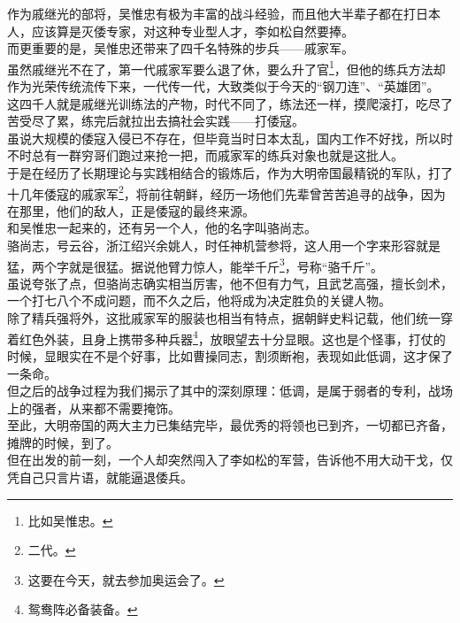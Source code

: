 \begin{multicols}{\theparacolNo}
作为戚继光的部将，吴惟忠有极为丰富的战斗经验，而且他大半辈子都在打日本人，应该算是灭倭专家，对这种专业型人才，李如松自然要捧。\\

而更重要的是，吴惟忠还带来了四千名特殊的步兵——戚家军。\\

虽然戚继光不在了，第一代戚家军要么退了休，要么升了官\footnote{比如吴惟忠。}，但他的练兵方法却作为光荣传统流传下来，一代传一代，大致类似于今天的“钢刀连”、“英雄团”。\\

这四千人就是戚继光训练法的产物，时代不同了，练法还一样，摸爬滚打，吃尽了苦受尽了累，练完后就拉出去搞社会实践——打倭寇。\\

虽说大规模的倭寇入侵已不存在，但毕竟当时日本太乱，国内工作不好找，所以时不时总有一群穷哥们跑过来抢一把，而戚家军的练兵对象也就是这批人。\\

于是在经历了长期理论与实践相结合的锻炼后，作为大明帝国最精锐的军队，打了十几年倭寇的戚家军\footnote{二代。}，将前往朝鲜，经历一场他们先辈曾苦苦追寻的战争，因为在那里，他们的敌人，正是倭寇的最终来源。\\

和吴惟忠一起来的，还有另一个人，他的名字叫骆尚志。\\

骆尚志，号云谷，浙江绍兴余姚人，时任神机营参将，这人用一个字来形容就是猛，两个字就是很猛。据说他臂力惊人，能举千斤\footnote{这要在今天，就去参加奥运会了。}，号称“骆千斤”。\\

虽说夸张了点，但骆尚志确实相当厉害，他不但有力气，且武艺高强，擅长剑术，一个打七八个不成问题，而不久之后，他将成为决定胜负的关键人物。\\

除了精兵强将外，这批戚家军的服装也相当有特点，据朝鲜史料记载，他们统一穿着红色外装，且身上携带多种兵器\footnote{鸳鸯阵必备装备。}，放眼望去十分显眼。这也是个怪事，打仗的时候，显眼实在不是个好事，比如曹操同志，割须断袍，表现如此低调，这才保了一条命。\\

但之后的战争过程为我们揭示了其中的深刻原理：低调，是属于弱者的专利，战场上的强者，从来都不需要掩饰。\\

至此，大明帝国的两大主力已集结完毕，最优秀的将领也已到齐，一切都已齐备，摊牌的时候，到了。\\

但在出发的前一刻，一个人却突然闯入了李如松的军营，告诉他不用大动干戈，仅凭自己只言片语，就能逼退倭兵。\\


\end{multicols}
